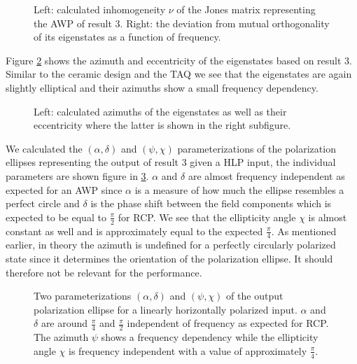\begin{figure}[H]
    \centering
    
    \caption{Left: calculated inhomogeneity $\nu$ of the Jones matrix representing the AWP of result 3. Right: the deviation from mutual orthogonality of its eigenstates as a function of frequency.}
    \label{fig:inhomogeneity_orthogonality}
\end{figure}

Figure \ref{fig:polymer_eigenstate_params} shows the azimuth and eccentricity of the eigenstates based on result 3. Similar to the ceramic design and the TAQ we see that the eigenstates are again slightly elliptical and their azimuths show a small frequency dependency.

\begin{figure}[H]
    \centering
    
    \caption{Left: calculated azimuths of the eigenstates as well as their eccentricity where the latter is shown in the right subfigure.}
    \label{fig:polymer_eigenstate_params}
\end{figure}

We calculated the $(\alpha, \delta)$ and $(\psi, \chi)$ parameterizations of the polarization ellipses representing the output of result 3 given a HLP input, the individual parameters are shown figure in \ref{fig:polymer_params_dotted}. $\alpha$ and $\delta$ are almost frequency independent as expected for an AWP since $\alpha$ is a measure of how much the ellipse resembles a perfect circle and $\delta$ is the phase shift between the field components which is expected to be equal to $\frac{\pi}{2}$ for RCP. We see that the ellipticity angle $\chi$ is almost constant as well and is approximately equal to the expected $\frac{\pi}{4}$. As mentioned earlier, in theory the azimuth is undefined for a perfectly circularly polarized state since it determines the orientation of the polarization ellipse. It should therefore not be relevant for the performance.

\begin{figure}[H]
    \centering
    
    \caption{Two parameterizations $(\alpha, \delta)$ and $(\psi, \chi)$ of the output polarization ellipse for a linearly horizontally polarized input. $\alpha$ and $\delta$ are around $\frac{\pi}{4}$ and $\frac{\pi}{2}$ independent of frequency as expected for RCP. The azimuth $\psi$ shows a frequency dependency while the ellipticity angle $\chi$ is frequency independent with a value of approximately $\frac{\pi}{4}$.}
    \label{fig:polymer_params_dotted}
\end{figure}

